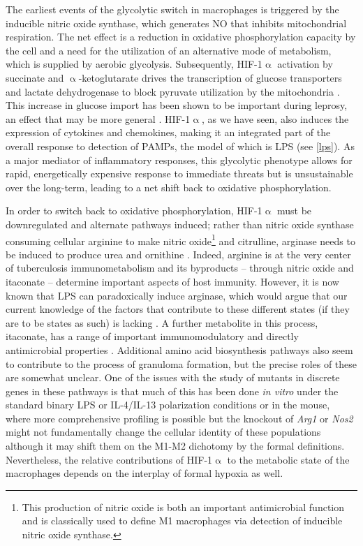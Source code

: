 The earliest events of the glycolytic switch in macrophages is triggered by the inducible nitric oxide synthase, which generates NO that inhibits mitochondrial respiration. The net effect is a reduction in oxidative phosphorylation capacity by the cell and a need for the utilization of an alternative mode of metabolism, which is supplied by aerobic glycolysis. Subsequently, HIF\hyp{}1$\upalpha$ activation by succinate and $\upalpha$\hyp{}ketoglutarate drives the transcription of glucose transporters and lactate dehydrogenase to block pyruvate utilization by the mitochondria \citep{Russell2019, GalvanPena2014}. This increase in glucose import has been shown to be important during leprosy, an effect that may be more general \citep{Medeiros2016, MontoyaRosales2016, Vance2019}. HIF\hyp{}1$\upalpha$, as we have seen, also induces the expression of cytokines and chemokines, making it an integrated part of the overall response to detection of PAMPs, the model of which is LPS (see \autoref{lps}). As a major mediator of inflammatory responses, this glycolytic phenotype allows for rapid, energetically expensive response to immediate threats but is unsustainable over the long\hyp{}term, leading to a net shift back to oxidative phosphorylation.

In order to switch back to oxidative phosphorylation, HIF\hyp{}1$\upalpha$ must be downregulated and alternate pathways induced; rather than nitric oxide synthase consuming cellular arginine to make nitric oxide\footnote{This production of nitric oxide is both an important antimicrobial function and is classically used to define M1 macrophages via detection of inducible nitric oxide synthase.} and citrulline, arginase needs to be induced to produce urea and ornithine \citep{Palmieri2020, Qualls2016}. Indeed, arginine is at the very center of tuberculosis immunometabolism and its byproducts -- through nitric oxide and itaconate -- determine important aspects of host immunity. However, it is now known that LPS can paradoxically induce arginase, which would argue that our current knowledge of the factors that contribute to these different states (if they are to be states as such) is lacking \citep{ElKasmi2008}. A further metabolite in this process, itaconate, has a range of important immunomodulatory and directly antimicrobial properties \citep{He2021}. Additional amino acid biosynthesis pathways also seem to contribute to the process of granuloma formation, but the precise roles of these are somewhat unclear. One of the issues with the study of mutants in discrete genes in these pathways is that much of this has been done \textit{in vitro} under the standard binary LPS or IL\hyp{}4/IL\hyp{}13 polarization conditions or in the mouse, where more comprehensive profiling is possible but the knockout of \textit{Arg1} or \textit{Nos2} might not fundamentally change the cellular identity of these populations although it may shift them on the M1\hyp{}M2 dichotomy by the formal definitions. Nevertheless, the relative contributions of HIF\hyp{}1$\upalpha$ to the metabolic state of the macrophages depends on the interplay of formal hypoxia as well. 

